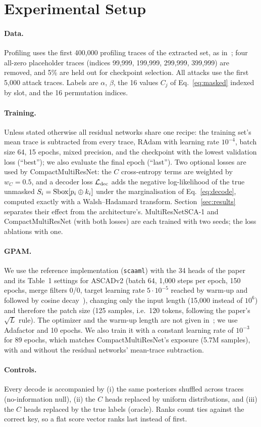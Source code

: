 \section{Experimental Setup}
\label{sec:setup}

\paragraph{Data.} Profiling uses the first 400,000 profiling traces of the extracted set, as
in~\cite{MS23}; four all-zero placeholder traces (indices 99,999, 199,999, 299,999, 399,999) are
removed, and 5\% are held out for checkpoint selection. All attacks use the first 5,000 attack
traces. Labels are $\alpha$, $\beta$, the 16 values $C_j$ of Eq.~\eqref{eq:masked} indexed by slot,
and the 16 permutation indices.

\paragraph{Training.} Unless stated otherwise all residual networks share one recipe: the training
set's mean trace is subtracted from every trace, RAdam with learning rate $10^{-4}$, batch size 64,
15 epochs, mixed precision, and the checkpoint with the lowest validation loss (``best''); we also
evaluate the final epoch (``last''). Two optional losses are used by CompactMultiResNet: the $C$
cross-entropy terms are weighted by $w_C=0.5$, and a decoder loss $\mathcal{L}_{\mathrm{dec}}$ adds the negative
log-likelihood of the true unmasked $S_i=\mathrm{Sbox}[p_i\oplus k_i]$ under the marginalisation of
Eq.~\eqref{eq:decode}, computed exactly with a Walsh--Hadamard transform. Section~\ref{sec:results}
separates their effect from the architecture's. MultiResNetSCA-1 and CompactMultiResNet (with both losses) are each trained with two seeds; the
loss ablations with one.

\paragraph{GPAM.} We use the reference implementation (\texttt{scaaml}) with the 34 heads of the
paper and its Table~1 settings for ASCADv2 (batch 64, 1,000 steps per epoch, 150 epochs, merge
filters 0/0, target learning rate $5\cdot10^{-5}$ reached by warm-up and followed by cosine
decay~\cite{GPAM}), changing only the input length (15,000 instead of $10^6$) and therefore the patch
size (125 samples, i.e.\ 120 tokens, following the paper's $\sqrt{L}$ rule). The optimizer and the
warm-up length are not given in~\cite{GPAM}; we use Adafactor and 10 epochs. We also train it with a
constant learning rate of $10^{-3}$ for 89 epochs, which matches CompactMultiResNet's exposure
(5.7M samples), with and without the residual networks' mean-trace subtraction.

\paragraph{Controls.} Every decode is accompanied by (i) the same posteriors shuffled across traces
(no-information null), (ii) the $C$ heads replaced by uniform distributions, and (iii) the $C$ heads
replaced by the true labels (oracle). Ranks count ties against the correct key, so a flat score
vector ranks last instead of first.
